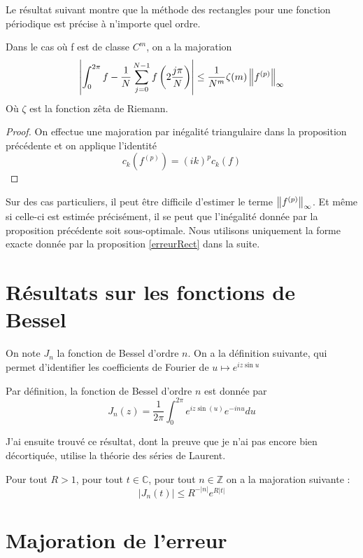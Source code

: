\documentclass[11pt,a4paper]{article}
\begin{document}
Le résultat suivant montre que la méthode des rectangles pour une fonction périodique est précise à n'importe quel ordre. 

\begin{Prop} 
Dans le cas où f est de classe $C^m$, on a la majoration \[\left| \int_0^{2\pi}f - \frac{1}{N}\sum_{j = 0}^{N-1}f \left(2\frac{j\pi}{N}\right)\right| \leq \frac{1}{N^m} \zeta(m) \left\|f^{(p)}\right\|_{\infty}\]
Où $\zeta$ est la fonction zêta de Riemann. 
 

\begin{proof}
On effectue une majoration par inégalité triangulaire dans la proposition précédente et on applique l'identité \[c_k\left(f^{(p)}\right) = (ik)^p c_k(f)\]
\end{proof}
\end{Prop}

Sur des cas particuliers, il peut être difficile d'estimer le terme $\left\|f^{(p)}\right\|_{\infty}$. Et même si celle-ci est estimée précisément, il se peut que l'inégalité donnée par la proposition précédente soit sous-optimale. Nous utilisons uniquement la forme exacte donnée par la proposition \ref{erreurRect} dans la suite. 

\section{Résultats sur les fonctions de Bessel}

On note $J_n$ la fonction de Bessel d'ordre $n$. 
On a la définition suivante, qui permet d'identifier les coefficients de Fourier de $u \mapsto e^{iz\sin u}$

\begin{Def}
Par définition, la fonction de Bessel d'ordre $n$ est donnée par 
\[J_n(z) = \frac{1}{2\pi}\int_{0}^{2\pi} e^{iz\sin(u)}e^{-inu}du\]
\end{Def}

J'ai ensuite trouvé ce résultat, dont la preuve que je n'ai pas encore bien décortiquée, utilise la théorie des séries de Laurent.  

\begin{Prop}
Pour tout $R>1$, pour tout $t\in\mathbb{C}$, pour tout $n\in \mathbb{Z}$ on a la majoration suivante : \[|J_n(t)| \leq R^{-|n|}e^{R|t|} \]

\end{Prop}

\section{Majoration de l'erreur}
\end{document}
